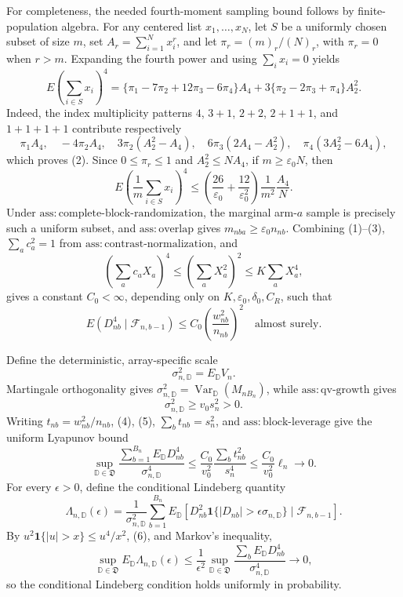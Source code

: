 For completeness, the needed fourth-moment sampling bound follows by finite-population algebra.  For any centered list \(x_1,\ldots,x_N\), let \(S\) be a uniformly chosen subset of size \(m\), set \(A_r=\sum_{i=1}^N x_i^r\), and let \(\pi_r=(m)_r/(N)_r\), with \(\pi_r=0\) when \(r>m\).  Expanding the fourth power and using \(\sum_i x_i=0\) yields
\[
E\left(\sum_{i\in S}x_i\right)^4
=\{\pi_1-7\pi_2+12\pi_3-6\pi_4\}A_4
+3\{\pi_2-2\pi_3+\pi_4\}A_2^2.
\tag{2}
\]
Indeed, the index multiplicity patterns \(4\), \(3+1\), \(2+2\), \(2+1+1\), and \(1+1+1+1\) contribute respectively
\[
\pi_1A_4,\quad -4\pi_2A_4,\quad
3\pi_2(A_2^2-A_4),\quad
6\pi_3(2A_4-A_2^2),\quad
\pi_4(3A_2^2-6A_4),
\]
which proves (2).  Since \(0\le\pi_r\le1\) and \(A_2^2\le NA_4\), if \(m\ge\varepsilon_0N\), then
\[
E\left(\frac1m\sum_{i\in S}x_i\right)^4
\le \left(\frac{26}{\varepsilon_0}+\frac{12}{\varepsilon_0^2}\right)
\frac1{m^2}\frac{A_4}{N}.
\tag{3}
\]
Under \(\mathrm{ass:complete\text{-}block\text{-}randomization}\), the marginal arm-\(a\) sample is precisely such a uniform subset, and \(\mathrm{ass:overlap}\) gives \(m_{nba}\ge\varepsilon_0n_{nb}\).  Combining (1)--(3), \(\sum_ac_a^2=1\) from \(\mathrm{ass:contrast\text{-}normalization}\), and
\[
\left(\sum_ac_aX_a\right)^4
\le\left(\sum_aX_a^2\right)^2
\le K\sum_aX_a^4,
\]
gives a constant \(C_0<\infty\), depending only on \(K,\varepsilon_0,\delta_0,C_R\), such that
\[
E(D_{nb}^4\mid\mathcal F_{n,b-1})
\le C_0\left(\frac{w_{nb}^2}{n_{nb}}\right)^2
\quad\text{almost surely.}
\tag{4}
\]

Define the deterministic, array-specific scale
\[
\sigma_{n,\mathbb D}^2=E_{\mathbb D}V_n.
\]
Martingale orthogonality gives \(\sigma_{n,\mathbb D}^2=\operatorname{Var}_{\mathbb D}(M_{nB_n})\), while \(\mathrm{ass:qv\text{-}growth}\) gives
\[
\sigma_{n,\mathbb D}^2\ge v_0s_n^2>0.
\tag{5}
\]
Writing \(t_{nb}=w_{nb}^2/n_{nb}\), (4), (5), \(\sum_bt_{nb}=s_n^2\), and \(\mathrm{ass:block\text{-}leverage}\) give the uniform Lyapunov bound
\[
\sup_{\mathbb D\in\mathfrak D}
\frac{\sum_{b=1}^{B_n}E_{\mathbb D}D_{nb}^4}{\sigma_{n,\mathbb D}^4}
\le\frac{C_0}{v_0^2}
\frac{\sum_bt_{nb}^2}{s_n^4}
\le\frac{C_0}{v_0^2}\ell_n\longrightarrow0.
\tag{6}
\]
For every \(\epsilon>0\), define the conditional Lindeberg quantity
\[
\Lambda_{n,\mathbb D}(\epsilon)
=\frac1{\sigma_{n,\mathbb D}^2}\sum_{b=1}^{B_n}
E_{\mathbb D}\left[D_{nb}^2\mathbf 1\{|D_{nb}|>\epsilon\sigma_{n,\mathbb D}\}
\mid\mathcal F_{n,b-1}\right].
\]
By \(u^2\mathbf 1\{|u|>x\}\le u^4/x^2\), (6), and Markov's inequality,
\[
\sup_{\mathbb D\in\mathfrak D}E_{\mathbb D}\Lambda_{n,\mathbb D}(\epsilon)
\le\frac1{\epsilon^2}
\sup_{\mathbb D\in\mathfrak D}
\frac{\sum_bE_{\mathbb D}D_{nb}^4}{\sigma_{n,\mathbb D}^4}
\longrightarrow0,
\tag{7}
\]
so the conditional Lindeberg condition holds uniformly in probability.

